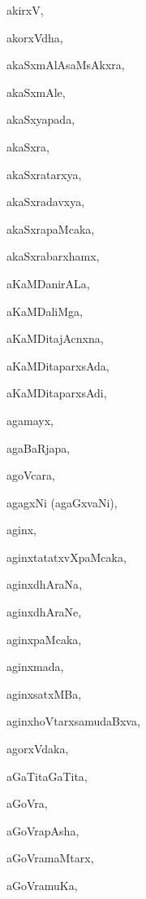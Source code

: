 \begin{multicols}{2}
{akirxV}, \pageref{akirxV}

{akorxVdha}, \pageref{akorxVdha}

{akaSxmAlAsaMsAkxra}, \pageref{akaSxmAlAsaMsAkxra}

{akaSxmAle}, \pageref{akaSxmAle}

{akaSxyapada}, \pageref{akaSxyapada}

{akaSxra}, \pageref{akaSxra}

{akaSxratarxya}, \pageref{akaSxratarxya}

{akaSxradavxya}, \pageref{akaSxradavxya}

{akaSxrapaMcaka}, \pageref{akaSxrapaMcaka}

{akaSxrabarxhamx}, \pageref{akaSxrabarxhamx}

{aKaMDanirALa}, \pageref{aKaMDanirALa}

{aKaMDaliMga}, \pageref{aKaMDaliMga}

{aKaMDitajAcnxna}, \pageref{aKaMDitajAcnxna}

{aKaMDitaparxsAda}, \pageref{aKaMDitaparxsAda}

{aKaMDitaparxsAdi}, \pageref{aKaMDitaparxsAdi}

{agamayx}, \pageref{agamayx}

{agaBaRjapa}, \pageref{agaBaRjapa}

{agoVcara}, \pageref{agoVcara}

{agagxNi (agaGxvaNi)}, \pageref{agagxNi (agaGxvaNi)}

{aginx}, \pageref{aginx}

{aginxtatatxvXpaMcaka}, \pageref{aginxtatatxvXpaMcaka}

{aginxdhAraNa}, \pageref{aginxdhAraNa}

{aginxdhAraNe}, \pageref{aginxdhAraNe}

{aginxpaMcaka}, \pageref{aginxpaMcaka}

{aginxmada}, \pageref{aginxmada}

{aginxsatxMBa}, \pageref{aginxsatxMBa}

{aginxhoVtarxsamudaBxva}, \pageref{aginxhoVtarxsamudaBxva}

{agorxVdaka}, \pageref{agorxVdaka}

{aGaTitaGaTita}, \pageref{aGaTitaGaTita}

{aGoVra}, \pageref{aGoVra}

{aGoVrapAsha}, \pageref{aGoVrapAsha}

{aGoVramaMtarx}, \pageref{aGoVramaMtarx}

{aGoVramuKa}, \pageref{aGoVramuKa}


\end{multicols}
